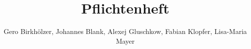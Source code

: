 \title{Pflichtenheft}
\author{Gero Birkhölzer, Johannes Blank, Alexej Gluschkow, Fabian Klopfer, Lisa-Maria Mayer}
\maketitle
